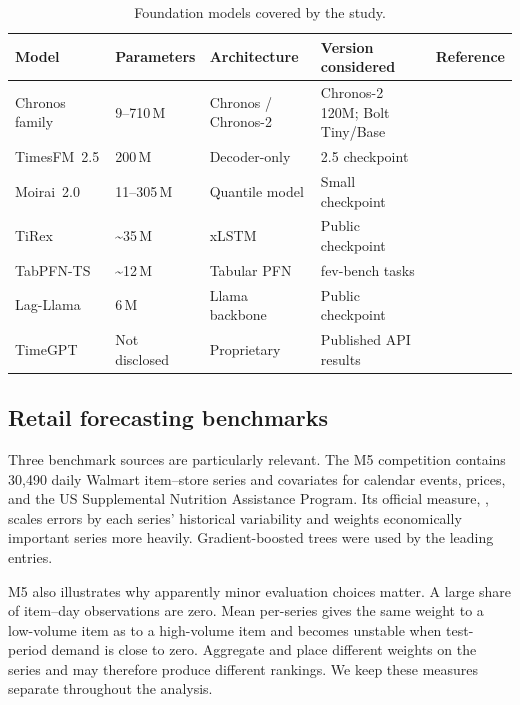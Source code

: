 \begin{table}[htbp]
\centering
\caption{Foundation models covered by the study.}
\label{tab:fm-scope}\label{tab:fm_models}
\footnotesize
\begin{tabularx}{\textwidth}{l l X X X}
\toprule
Model & Parameters & Architecture & Version considered & Reference \\
\midrule
Chronos family & 9--710\,M & Chronos / Chronos-2 & Chronos-2 120M; Bolt Tiny/Base &
  \citet{ansari2024chronos,ansari2025chronos2} \\
TimesFM~2.5 & 200\,M & Decoder-only & 2.5 checkpoint & \citet{das2025timesfm2} \\
Moirai~2.0 & 11--305\,M & Quantile model & Small checkpoint & \citet{liu2025moirai2} \\
TiRex & \textasciitilde{}35\,M & xLSTM & Public checkpoint & \citet{auer2025tirex} \\
TabPFN-TS & \textasciitilde{}12\,M & Tabular PFN & fev-bench tasks & \citet{mueller2025tabpfnts} \\
Lag-Llama & 6\,M & Llama backbone & Public checkpoint & \citet{rasul2023laglama} \\
TimeGPT & Not disclosed & Proprietary & Published API results & \citet{garza2023timegpt} \\
\bottomrule
\end{tabularx}
\end{table}

\subsection{Retail forecasting benchmarks}
\label{sec:existing-benchmarks}

Three benchmark sources are particularly relevant. The M5 competition
\citep{makridakis2022m5} contains 30,490 daily Walmart item--store series and
covariates for calendar events, prices, and the US Supplemental Nutrition
Assistance Program. Its official measure, \WRMSSE{}, scales errors by each
series' historical variability and weights economically important series more
heavily. Gradient-boosted trees were used by the leading entries.
\label{sec:m5-benchmark}

M5 also illustrates why apparently minor evaluation choices matter. A large
share of item--day observations are zero. Mean per-series \WAPE{} gives the
same weight to a low-volume item as to a high-volume item and becomes unstable
when test-period demand is close to zero. Aggregate \WAPE{} and \WRMSSE{}
place different weights on the series and may therefore produce different
rankings. We keep these measures separate throughout the analysis.

